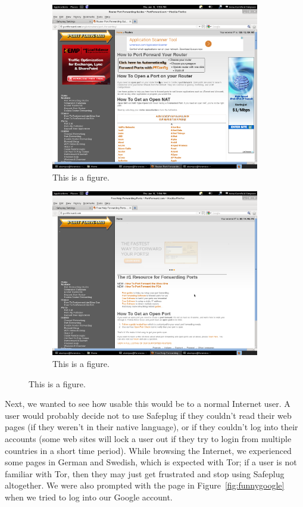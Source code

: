 \begin{figure}[htb]
\centering
\begin{subfigure}[b]{.4\textwidth}
\includegraphics[width=\textwidth]{before}
\caption{This is a figure.}
\label{fig:before}
\end{subfigure}%
\quad
\begin{subfigure}[b]{.4\textwidth}
\includegraphics[width=\textwidth]{after}
\caption{This is a figure.}
\label{fig:after}
\end{subfigure}
\end{figure}

Next, we wanted to see how usable this would be to a normal Internet user.  A user would probably decide not to use Safeplug if they couldn't read their web pages (if they weren't in their native language), or if they couldn't log into their accounts (some web sites will lock a user out if they try to login from multiple countries in a short time period).  While browsing the Internet, we experienced some pages in German and Swedish, which is expected with Tor; if a user is not familiar with Tor, then they may just get frustrated and stop using Safeplug altogether.  We were also prompted with the page in Figure~\ref{fig:funnygoogle} when we tried to log into our Google account. 

